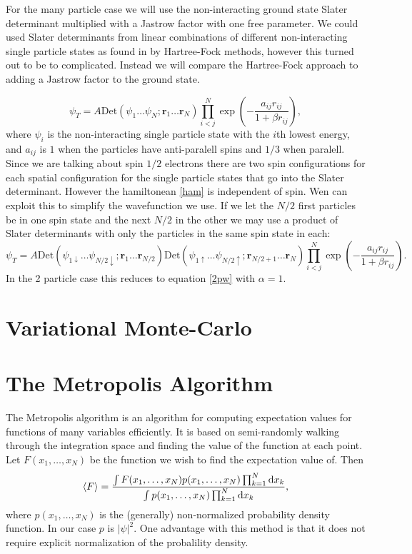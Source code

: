 \documentclass[a4paper,norsk,10pt]{article}
\newcommand{\bb}[1]{\boldsymbol{#1}}
\newcommand{\dd}{\mathrm{d}}
\newcommand{\uar}{\uparrow}
\newcommand{\dar}{\downarrow}
\newcommand{\be}{\begin{equation}}
\newcommand{\ee}{\end{equation}}
\newcommand{\f}{\frac}
\begin{document}
For the many particle case we will use the non-interacting ground state Slater determinant multiplied with a Jastrow factor with one free parameter.
We could used Slater determinants from linear combinations of different non-interacting single particle states as found in \cite{proj1} by Hartree-Fock methods,
however this turned out to be to complicated. Instead we will compare the Hartree-Fock approach to adding a Jastrow factor to the ground state.

\be
\psi_T = A \mathrm{Det}\left(\psi_1\ldots\psi_N;\bb{r}_1\ldots\bb{r}_N\right)\prod_{i<j}^N\exp\left(-\f{a_{ij}r_{ij}}{1+\beta r_{ij}}\right),
\ee
where  $\psi_i$ is the non-interacting single particle state with the $i$th lowest energy,
and $a_{ij}$ is $1$ when the particles have anti-paralell spins and $1/3$ when paralell.
Since we are talking about spin $1/2$ electrons there are two spin configurations for each spatial configuration for the single particle states that go into the Slater determinant.
However the hamiltonean \ref{ham} is independent of spin. Wen can exploit this to simplify the wavefunction we use. If we let
the $N/2$ first particles be in one spin state and the next $N/2$ in the other we may use a product of Slater determinants with only the particles in the same spin state in each:
\be
\psi_T = A\mathrm{Det}\left(\psi_{1\dar}\ldots\psi_{N/2\dar};\bb{r}_1\ldots\bb{r}_{N/2}\right)\mathrm{Det}\left(\psi_{1\uar}\ldots\psi_{N/2\uar};\bb{r}_{N/2+1}\ldots\bb{r}_N\right)\prod_{i<j}^N\exp\left(-\f{a_{ij}r_{ij}}{1+\beta r_{ij}}\right).\label{npw}
\ee
In the 2 particle case this reduces to equation \ref{2pw} with $\alpha = 1$.
\section{Variational Monte-Carlo}





\section{The Metropolis Algorithm}

The Metropolis algorithm is an algorithm for computing expectation values for functions of many variables efficiently.
It is based on semi-randomly walking through the integration space and finding the value of the function at each point.
Let \(F(x_1,\ldots,x_N)\) be the function we wish to find the expectation value of. Then
\be
\braket{F} = \f{\int F(x_1,\ldots,x_N)p(x_1,\ldots,x_N)\prod_{k=1}^N\dd x_k}{\int p(x_1,\ldots,x_N)\prod_{k=1}^N\dd x_k}, \label{exp}
\ee
where \(p(x_1,\ldots,x_N)\) is the (generally) non-normalized probability density function. In our case \(p\) is \(|\psi|^2\).
One advantage with this method is that it does not require explicit normalization of the probalility density.
\end{document}
